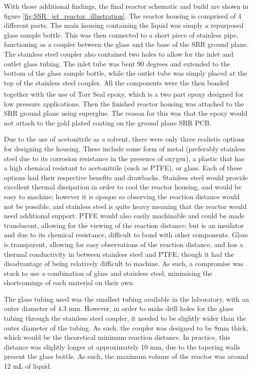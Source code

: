 With those additional findings, the final reactor schematic and build are shown in figure \ref{fig:SSR_jet_reactor_illustration}. The reactor housing is comprised of 4 different parts. The main housing containing the liquid was simply a repurposed glass sample bottle. This was then connected to a short piece of stainless pipe, functioning as a coupler between the glass and the base of the SRR ground plane. The stainless steel coupler also contained two holes to allow for the inlet and outlet glass tubing. The inlet tube was bent 90 degrees and extended to the bottom of the glass sample bottle, while the outlet tube was simply placed at the top of the stainless steel coupler. All the components were the then bonded together with the use of Torr Seal\textsuperscript{\tiny{\textregistered}} epoxy, which is a two part epoxy designed for low pressure applications. Then the finished reactor housing was attached to the SRR ground plane using superglue. The reason for this was that the epoxy would not attach to the gold plated coating on the ground plane SRR PCB.

Due to the use of acetonitrile as a solvent, there were only three realistic options for designing the housing. These include some form of metal (preferably stainless steel due to its corrosion resistance in the presence of oxygen), a plastic that has a high chemical resistant to acetonitrile (such as PTFE), or glass. Each of these options had their respective benefits and drawbacks. Stainless steel would provide excellent thermal dissipation in order to cool the reactor housing, and would be easy to machine; however it is opaque so observing the reaction distance would not be possible, and stainless steel is quite heavy meaning that the reactor would need additional support. PTFE would also easily machinable and could be made translucent, allowing for the viewing of the reaction distance; but is an insulator and due to its chemical resistance, difficult to bond with other components. Glass is transparent, allowing for easy observations of the reaction distance, and has a thermal conductivity in between stainless steel and PTFE; though it had the disadvantage of being relatively difficult to machine. As such, a compromise was stuck to use a combination of glass and stainless steel, minimising the shortcomings of each material on their own.

The glass tubing used was the smallest tubing available in the laboratory, with an outer diameter of 4.3 mm. However, in order to make drill holes for the glass tubing through the stainless steel coupler, it needed to be slightly wider than the outer diameter of the tubing. As such, the coupler was designed to be 8mm thick, which would be the theoretical minimum reaction distance. In practice, this distance was slightly longer at approximately 10 mm, due to the tapering walls present the glass bottle. As such, the maximum volume of the reactor was around 12 mL of liquid. 

